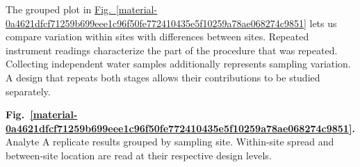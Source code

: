 \documentclass[11pt,a4paper]{article}
\begin{document}
The grouped plot in \hyperref[material-0a4621dfcf71259b699eee1c96f50fe772410435e5f10259a78ae068274c9851]{Fig.~\ref*{material-0a4621dfcf71259b699eee1c96f50fe772410435e5f10259a78ae068274c9851}} lets us compare variation within sites with differences between sites. Repeated instrument readings characterize the part of the procedure that was repeated. Collecting independent water samples additionally represents sampling variation. A design that repeats both stages allows their contributions to be studied separately.


\par\medskip
\Needspace{10cm}
\label{material-0a4621dfcf71259b699eee1c96f50fe772410435e5f10259a78ae068274c9851}
\noindent\textbf{Fig.~\ref*{material-0a4621dfcf71259b699eee1c96f50fe772410435e5f10259a78ae068274c9851}.} Analyte A replicate results grouped by sampling site. Within-site spread and between-site location are read at their respective design levels.\par\nopagebreak
\end{document}
